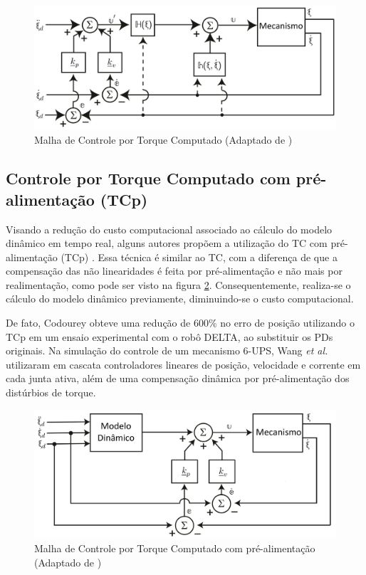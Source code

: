 \documentclass[]{politex}
\begin{document}
\begin{figure}[h]
	\centering
	\includegraphics[scale=0.39]{../figures/CTCnew.jpg}  
	\caption{Malha de Controle por Torque Computado (Adaptado de \cite{Craig})}
	\label{fig:CTC}
\end{figure}

\subsection{Controle por Torque Computado com pré-alimentação (TCp)}

Visando a redução do custo computacional associado ao cálculo do modelo dinâmico em tempo real, alguns autores propõem a utilização do TC com pré-alimentação (TCp) \cite{Khalil, Siciliano, Spong}. Essa técnica é similar ao TC, com a diferença de que a compensação das não linearidades é feita por pré-alimentação e não mais por realimentação, como pode ser visto na figura \ref{fig:CTCp}. Consequentemente, realiza-se o cálculo do modelo dinâmico previamente, diminuindo-se o custo computacional.

De fato, Codourey \cite{Codourey} obteve uma redução de 600\% no erro de posição utilizando o TCp em um ensaio experimental com o robô DELTA, ao substituir os PDs originais. Na simulação do controle de um mecanismo 6-UPS, Wang \emph{et al.} \cite{Wang} utilizaram em cascata controladores lineares de posição, velocidade e corrente em cada junta ativa, além de  uma compensação dinâmica por pré-alimentação dos distúrbios de torque.

\begin{figure}[h]
	\centering
	\includegraphics[scale=0.39]{../figures/CTCpnew.jpg}  
	\caption{Malha de Controle por Torque Computado com pré-alimentação (Adaptado de \cite{Craig})}
	\label{fig:CTCp}
\end{figure}
\end{document}
